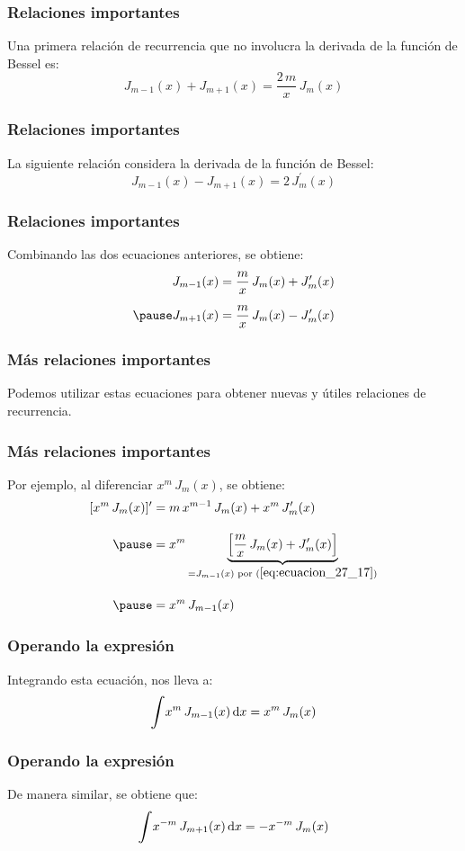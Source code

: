 \documentclass[12pt]{beamer}
\begin{document}
\begin{frame}
\frametitle{Relaciones importantes}
Una primera relación de recurrencia que no involucra la derivada de la función de Bessel es:
\pause
\begin{equation}
J_{m-1} (x) + J_{m+1} (x) = \dfrac{2 \, m}{x} \, J_{m} (x)
\label{eq:ecuacion_27_15}
\end{equation}
\end{frame}
\begin{frame}
\frametitle{Relaciones importantes}    
La siguiente relación considera la derivada de la función de Bessel:
\pause
\begin{equation}
J_{m-1} (x) - J_{m+1} (x) = 2 \, J_{m}^{\prime} (x)
\label{eq:ecuacion_27_16}
\end{equation}
\end{frame}
\begin{frame}
\frametitle{Relaciones importantes}    
Combinando las dos ecuaciones anteriores, se obtiene:
\pause
\begin{eqnarray}
\begin{aligned}
J_{m-1}(x) &= \dfrac{m}{x} \, J_{m} (x) + J_{m}^{\prime} (x) \\[0.5em] \pause
J_{m+1}(x) &= \dfrac{m}{x} \, J_{m} (x) - J_{m}^{\prime} (x)
\end{aligned}
\label{eq:ecuacion_27_17}
\end{eqnarray}
\end{frame}
\begin{frame}
\frametitle{Más relaciones importantes}    
Podemos utilizar estas ecuaciones para obtener nuevas y útiles relaciones de recurrencia.
\end{frame}
\begin{frame}
\frametitle{Más relaciones importantes}
Por ejemplo, al diferenciar $x^{m} \, J_{m} (x)$, se obtiene:
\pause
\begin{eqnarray*}
\begin{aligned}
[x^{m} \, J_{m} (x)]^{\prime} &= m \, x^{m-1} \, J_{m} (x) + x^{m} \, J_{m}^{\prime} (x) \\[1em] \pause
&= x^{m} \underbrace{ \left[ \dfrac{m}{x} \, J_{m} (x) + J_{m}^{\prime} (x)\right]}_{=J_{m-1}(x) \text{ por } (\ref{eq:ecuacion_27_17})}  \\[1em] \pause
&= x^{m} \, J_{m-1} (x)
\end{aligned}
\end{eqnarray*}
\end{frame}
\begin{frame}
\frametitle{Operando la expresión}    
Integrando esta ecuación, nos lleva a:
\pause
\begin{equation}
\scaleint{6ex} x^{m} \, J_{m-1} (x) \dd{x} = x^{m} \, J_{m} (x)
\label{eq:ecuacion_27_18}
\end{equation}
\end{frame}
\begin{frame}
\frametitle{Operando la expresión}    
De manera similar, se obtiene que:
\pause
\begin{equation}
\scaleint{6ex} x^{-m} \, J_{m+1} (x) \dd{x} = -x^{-m} \, J_{m} (x)
\label{eq:ecuacion_27_19}
\end{equation}
\end{frame}
\end{document}
